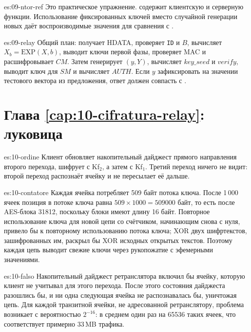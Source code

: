 \begin{soluzione}{es:09-ntor-ref}
Это практическое упражнение.  содержит клиентскую и серверную функции. Использование фиксированных ключей вместо случайной генерации новых даёт воспроизводимые значения для сравнения с .
\end{soluzione}

\begin{soluzione}{es:09-relay}
Общий план:  получает HDATA, проверяет \texttt{ID} и $B$, вычисляет $X_b = \mathrm{EXP}(X, b)$, выводит ключи первой фазы, проверяет MAC и расшифровывает $CM$. Затем  генерирует $(y, Y)$, вычисляет $\mathit{key\_seed}$ и $\mathit{verify}$, выводит ключ для $SM$ и вычисляет $\mathit{AUTH}$. Если $y$ зафиксировать на значении тестового вектора из предложения, ответ должен совпасть с .
\end{soluzione}

\section*{Глава \ref{cap:10-cifratura-relay}: луковица}

\begin{soluzione}{es:10-ordine}
Клиент обновляет накопительный дайджест прямого направления второго перехода, шифрует с Kf$_2$, а затем с Kf$_1$. Третий переход ничего не видит: второй переход распознаёт ячейку и не пересылает её дальше.
\end{soluzione}

\begin{soluzione}{es:10-contatore}
Каждая ячейка потребляет 509 байт потока ключа. После 1\,000 ячеек позиция в потоке ключа равна $509 \times 1000 = \num{509000}$ байт, то есть после AES-блока \num{31812}, поскольку блоки имеют длину 16 байт. Повторное использование ключа для новой цепи со счётчиком, начинающим снова с нуля, привело бы к повторному использованию потока ключа; XOR двух шифртекстов, зашифрованных им, раскрыл бы XOR исходных открытых текстов. Поэтому каждая цепь выводит свежие ключи через рукопожатие с эфемерными значениями.
\end{soluzione}

\begin{soluzione}{es:10-falso}
Накопительный дайджест ретранслятора включил бы ячейку, которую клиент не учитывал для этого перехода. После этого состояния дайджеста разошлись бы, и ни одна следующая ячейка не распознавалась бы, уничтожая цепь. Для каждой транзитной ячейки, не адресованной ретранслятору, проблема возникает с вероятностью $2^{-16}$: в среднем один раз на \num{65536} таких ячеек, что соответствует примерно 33\,MB трафика.
\end{soluzione}

